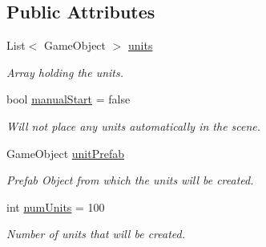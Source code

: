 \subsection*{Public Attributes}
\begin{DoxyCompactItemize}
\item 
\mbox{\label{class_p_s_flocking_1_1_p_s_unit_manager_aedaaee6bb56890420722506563f6b588}} 
List$<$ Game\+Object $>$ \hyperlink{class_p_s_flocking_1_1_p_s_unit_manager_aedaaee6bb56890420722506563f6b588}{units}
\begin{DoxyCompactList}\small\item\em Array holding the units. \end{DoxyCompactList}\item 
\mbox{\label{class_p_s_flocking_1_1_p_s_unit_manager_a1a733c51307f36d98644e35d833a7955}} 
bool \hyperlink{class_p_s_flocking_1_1_p_s_unit_manager_a1a733c51307f36d98644e35d833a7955}{manual\+Start} = false
\begin{DoxyCompactList}\small\item\em Will not place any units automatically in the scene. \end{DoxyCompactList}\item 
\mbox{\label{class_p_s_flocking_1_1_p_s_unit_manager_a4d79206a2784be39d27fcb36c91656e4}} 
Game\+Object \hyperlink{class_p_s_flocking_1_1_p_s_unit_manager_a4d79206a2784be39d27fcb36c91656e4}{unit\+Prefab}
\begin{DoxyCompactList}\small\item\em Prefab Object from which the units will be created. \end{DoxyCompactList}\item 
\mbox{\label{class_p_s_flocking_1_1_p_s_unit_manager_a765240b34b3a5ce19e6f711798c4d1bf}} 
int \hyperlink{class_p_s_flocking_1_1_p_s_unit_manager_a765240b34b3a5ce19e6f711798c4d1bf}{num\+Units} = 100
\begin{DoxyCompactList}\small\item\em Number of units that will be created. \end{DoxyCompactList}\item 
\mbox{\label{class_p_s_flocking_1_1_p_s_unit_manager_aa9c3797d524485b906ca919640f80c57}} 

\end{DoxyCompactItemize}
